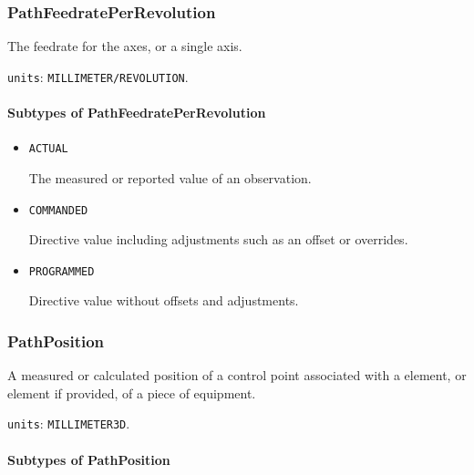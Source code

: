 \subsubsection{PathFeedratePerRevolution}
\label{sec:PathFeedratePerRevolution}



The feedrate for the axes, or a single axis.


\texttt{units}: \texttt{MILLIMETER/REVOLUTION}.

\paragraph{Subtypes of PathFeedratePerRevolution}\mbox{}
\label{sec:Subtypes of PathFeedratePerRevolution}

\begin{itemize}

\item \texttt{ACTUAL}


The measured or reported value of an \gls{observation}.

\item \texttt{COMMANDED}


Directive value including adjustments such as an offset or overrides.

\item \texttt{PROGRAMMED}


Directive value without offsets and adjustments.


\end{itemize}






\subsubsection{PathPosition}
\label{sec:PathPosition}



A measured or calculated position of a control point associated with a  element, or  element if provided, of a piece of equipment.


\texttt{units}: \texttt{MILLIMETER\textunderscore 3D}.

\paragraph{Subtypes of PathPosition}\mbox{}
\label{sec:Subtypes of PathPosition}

